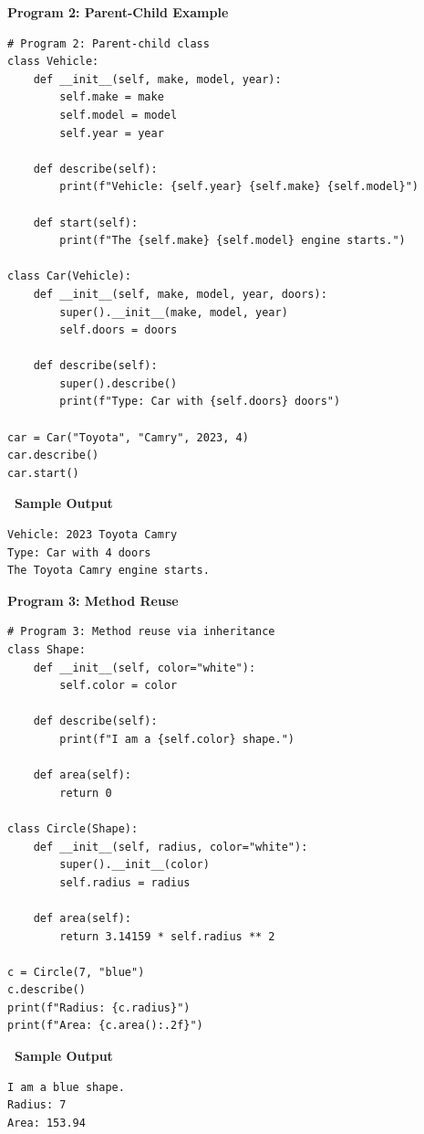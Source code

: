 \documentclass[12pt,a4paper]{article}
\newcommand{\outhead}{\noindent\colorbox{cmrgreen!25}%
  {\textbf{\small\color{cmrdark}~Sample Output~}}\par\vspace{-1pt}}
\begin{document}
\vspace{0.5cm}

\textbf{Program 2: Parent-Child Example}

\begin{lstlisting}
# Program 2: Parent-child class
class Vehicle:
    def __init__(self, make, model, year):
        self.make = make
        self.model = model
        self.year = year

    def describe(self):
        print(f"Vehicle: {self.year} {self.make} {self.model}")

    def start(self):
        print(f"The {self.make} {self.model} engine starts.")

class Car(Vehicle):
    def __init__(self, make, model, year, doors):
        super().__init__(make, model, year)
        self.doors = doors

    def describe(self):
        super().describe()
        print(f"Type: Car with {self.doors} doors")

car = Car("Toyota", "Camry", 2023, 4)
car.describe()
car.start()
\end{lstlisting}

\outhead
\begin{lstlisting}[style=outputstyle]
Vehicle: 2023 Toyota Camry
Type: Car with 4 doors
The Toyota Camry engine starts.
\end{lstlisting}

\vspace{0.5cm}

\textbf{Program 3: Method Reuse}

\begin{lstlisting}
# Program 3: Method reuse via inheritance
class Shape:
    def __init__(self, color="white"):
        self.color = color

    def describe(self):
        print(f"I am a {self.color} shape.")

    def area(self):
        return 0

class Circle(Shape):
    def __init__(self, radius, color="white"):
        super().__init__(color)
        self.radius = radius

    def area(self):
        return 3.14159 * self.radius ** 2

c = Circle(7, "blue")
c.describe()
print(f"Radius: {c.radius}")
print(f"Area: {c.area():.2f}")
\end{lstlisting}

\outhead
\begin{lstlisting}[style=outputstyle]
I am a blue shape.
Radius: 7
Area: 153.94
\end{lstlisting}
\end{document}
